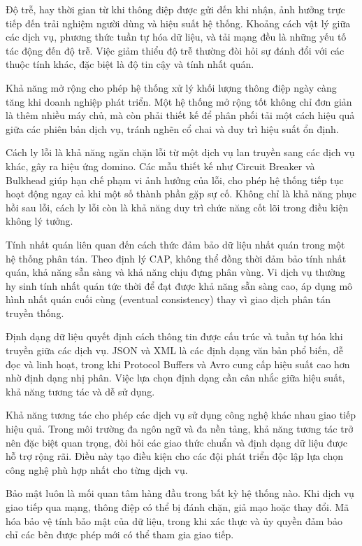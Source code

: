 Độ trễ, hay thời gian từ khi thông điệp được gửi đến khi nhận, ảnh hưởng trực tiếp đến trải nghiệm người dùng và hiệu suất hệ thống. Khoảng cách vật lý giữa các dịch vụ, phương thức tuần tự hóa dữ liệu, và tải mạng đều là những yếu tố tác động đến độ trễ. Việc giảm thiểu độ trễ thường đòi hỏi sự đánh đổi với các thuộc tính khác, đặc biệt là độ tin cậy và tính nhất quán.

Khả năng mở rộng cho phép hệ thống xử lý khối lượng thông điệp ngày càng tăng khi doanh nghiệp phát triển. Một hệ thống mở rộng tốt không chỉ đơn giản là thêm nhiều máy chủ, mà còn phải thiết kế để phân phối tải một cách hiệu quả giữa các phiên bản dịch vụ, tránh nghẽn cổ chai và duy trì hiệu suất ổn định.

Cách ly lỗi là khả năng ngăn chặn lỗi từ một dịch vụ lan truyền sang các dịch vụ khác, gây ra hiệu ứng domino. Các mẫu thiết kế như Circuit Breaker và Bulkhead giúp hạn chế phạm vi ảnh hưởng của lỗi, cho phép hệ thống tiếp tục hoạt động ngay cả khi một số thành phần gặp sự cố. Không chỉ là khả năng phục hồi sau lỗi, cách ly lỗi còn là khả năng duy trì chức năng cốt lõi trong điều kiện không lý tưởng.

Tính nhất quán liên quan đến cách thức đảm bảo dữ liệu nhất quán trong một hệ thống phân tán. Theo định lý CAP, không thể đồng thời đảm bảo tính nhất quán, khả năng sẵn sàng và khả năng chịu đựng phân vùng. Vi dịch vụ thường hy sinh tính nhất quán tức thời để đạt được khả năng sẵn sàng cao, áp dụng mô hình nhất quán cuối cùng (eventual consistency) thay vì giao dịch phân tán truyền thống.

Định dạng dữ liệu quyết định cách thông tin được cấu trúc và tuần tự hóa khi truyền giữa các dịch vụ. JSON và XML là các định dạng văn bản phổ biến, dễ đọc và linh hoạt, trong khi Protocol Buffers và Avro cung cấp hiệu suất cao hơn nhờ định dạng nhị phân. Việc lựa chọn định dạng cần cân nhắc giữa hiệu suất, khả năng tương tác và dễ sử dụng.

Khả năng tương tác cho phép các dịch vụ sử dụng công nghệ khác nhau giao tiếp hiệu quả. Trong môi trường đa ngôn ngữ và đa nền tảng, khả năng tương tác trở nên đặc biệt quan trọng, đòi hỏi các giao thức chuẩn và định dạng dữ liệu được hỗ trợ rộng rãi. Điều này tạo điều kiện cho các đội phát triển độc lập lựa chọn công nghệ phù hợp nhất cho từng dịch vụ.

Bảo mật luôn là mối quan tâm hàng đầu trong bất kỳ hệ thống nào. Khi dịch vụ giao tiếp qua mạng, thông điệp có thể bị đánh chặn, giả mạo hoặc thay đổi. Mã hóa bảo vệ tính bảo mật của dữ liệu, trong khi xác thực và ủy quyền đảm bảo chỉ các bên được phép mới có thể tham gia giao tiếp.

